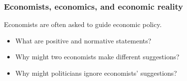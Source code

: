 \documentclass[aspectratio=169]{beamer}
\begin{document}




\begin{frame}
    \frametitle{Economists, economics, and economic reality}    
    Economists are often asked to guide economic policy.
    \begin{itemize}
        \item What are positive and normative statements?
        \item Why might two economists make different suggestions?
        \item Why might politicians ignore economists' suggestions?
    \end{itemize}
\end{frame}
\end{document}
